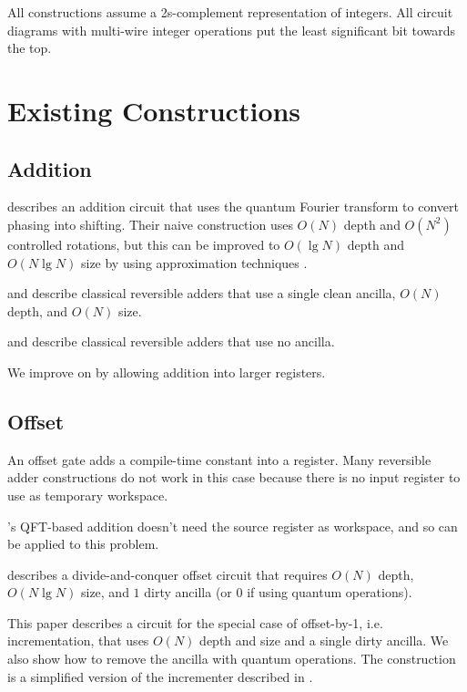 \documentclass[twocolumn]{article}
\begin{document}
All constructions assume a 2s-complement representation of integers.
All circuit diagrams with multi-wire integer operations put the least significant bit towards the top.

\section{Existing Constructions} \label{sec:review}

\subsection{Addition}

\cite{draper2000} describes an addition circuit that uses the quantum Fourier transform to convert phasing into shifting.
Their naive construction uses $O(N)$ depth and $O(N^2)$ controlled rotations, but this can be improved to $O(\lg N)$ depth and $O(N \lg N)$ size by using approximation techniques \cite{barenco1996} \cite{cleve2000}.

\cite{cuccaro2004} and \cite{van2004} describe classical reversible adders that use a single clean ancilla, $O(N)$ depth, and $O(N)$ size.

\cite{takahashi2005} and \cite{takahashi2009} describe classical reversible adders that use no ancilla.

We improve on \cite{takahashi2005} by allowing addition into larger registers.

\subsection{Offset}

An offset gate adds a compile-time constant into a register.
Many reversible adder constructions do not work in this case because there is no input register to use as temporary workspace.

\cite{draper2000}'s QFT-based addition doesn't need the source register as workspace, and so can be applied to this problem.

\cite{haner2016} describes a divide-and-conquer offset circuit that requires $O(N)$ depth, $O(N \lg N)$ size, and $1$ dirty ancilla (or 0 if using quantum operations).

This paper describes a circuit for the special case of offset-by-1, i.e. incrementation, that uses $O(N)$ depth and size and a single dirty ancilla.
We also show how to remove the ancilla with quantum operations.
The construction is a simplified version of the incrementer described in \cite{gidney2015}.
\end{document}
